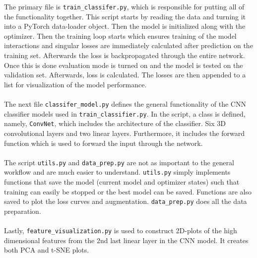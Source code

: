 \documentclass[12pt, fleqn, titlepage]{article}
\newcommand{\1}[1]{\mathds{1}\left[#1\right]}
\begin{document}
\noindent
The primary file is \texttt{train\_classifer.py}, which is responsible for putting all of the functionality together. This script starts by reading the data and turning it into a PyTorch data-loader object. Then the model is initialized along with the optimizer. Then the training loop starts which ensures training of the model interactions and singular losses are immediately calculated after prediction on the training set. Afterwards the loss is backpropagated through the entire network. Once this is done evaluation mode is turned on and the model is tested on the validation set.  Afterwards, loss is calculated. The losses are then appended to a list for visualization of the model performance.
\\\\
The next file \texttt{classifer\_model.py} defines the general functionality of the CNN classifier models used in \texttt{train\_classifier.py}. In the script, a class is defined, namely, \texttt{ConvNet}, which includes the architecture of the classifier. Six 3D convolutional layers and two linear layers. Furthermore, it includes the forward function which is used to forward the input through the network. 
\\\\
The script \texttt{utils.py} and \texttt{data\_prep.py} are not as important to the general workflow and are much easier to understand. \texttt{utils.py} simply implements functions that save the model (current model and optimizer states) such that training can easily be stopped or the best model can be saved. Functions are also saved to plot the loss curves and augmentation. \texttt{data\_prep.py} does all the data preparation.
\\\\
Lastly, \texttt{feature\_visualization.py} is used to construct 2D-plots of the high dimensional features from the 2nd last linear layer in the CNN model. It creates both PCA and t-SNE plots.
\end{document}
